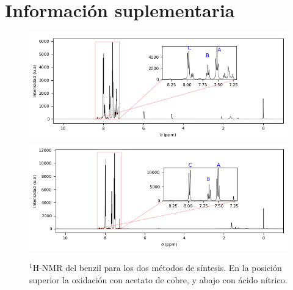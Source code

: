 \documentclass[fleqn,10pt]{SelfArx}
\begin{document}
\section{Informaci\'on suplementaria}\label{sec: complementaria}
\begin{figure}[h]
	\centering
	\includegraphics[width=\linewidth]{data/H-BenzilCu-T}
	\includegraphics[width=\linewidth]{data/H-BenzilHNO3-T}
	\caption{$^1$H-NMR del benzil para los dos m\'etodos de s\'intesis. En la posici\'on superior la oxidaci\'on con acetato de cobre, y abajo con \'acido n\'itrico.}
	\label{fig: HNMR-Benzil}
\end{figure}
\end{document}
